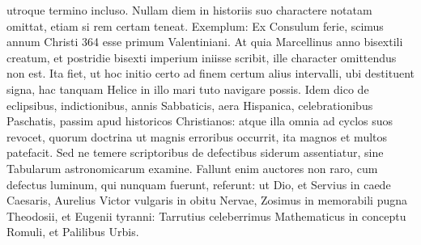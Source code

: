 \begin{parnumbers}
utroque termino incluso.
\lnr{}Nullam diem in historiis suo charactere
notatam omittat, etiam si rem certam teneat.
\lnr{}Exemplum: Ex Consulum
ferie, scimus annum Christi 364 esse primum Valentiniani.
\lnr{}At quia Marcellinus anno bisextili creatum, et postridie bisexti imperium
iniisse scribit, ille character omittendus non est.
\lnr{}Ita fiet, ut
hoc initio certo ad finem certum alius intervalli, ubi destituent signa,
hac tanquam Helice in illo mari tuto navigare possis.
\lnr{}Idem dico de eclipsibus, indictionibus, annis Sabbaticis, aera Hispanica,
celebrationibus Paschatis, passim apud historicos Christianos: atque
illa omnia ad cyclos suos revocet, quorum doctrina ut magnis erroribus
occurrit, ita magnos et multos patefacit.
\lnr{}Sed ne temere scriptoribus
de defectibus siderum assentiatur, sine Tabularum astronomicarum
examine.
\lnr{}Fallunt enim auctores non raro, cum defectus
luminum, qui nunquam fuerunt, referunt: ut Dio, et Servius in
caede Caesaris, Aurelius Victor vulgaris in obitu Nervae, Zosimus in
memorabili pugna Theodosii, et Eugenii tyranni: Tarrutius celeberrimus
Mathematicus in conceptu Romuli, et Palilibus Urbis.


\end{parnumbers}

